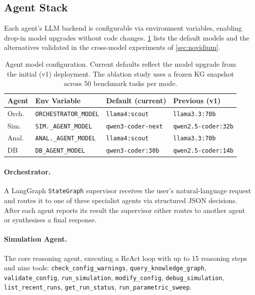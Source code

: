 \documentclass[twocolumn]{article}
\begin{document}
\subsection{Agent Stack}

Each agent's LLM backend is configurable via environment variables,
enabling drop-in model upgrades without code changes.
\cref{tab:agent-models} lists the default models and the alternatives
validated in the cross-model experiments of \cref{sec:novidium}.

\begin{table}[h]
\centering\scriptsize
\caption{Agent model configuration.  Current defaults reflect the
  model upgrade from the initial (v1) deployment.  The ablation study uses a frozen KG snapshot
  across 50 benchmark tasks per mode.}
\label{tab:agent-models}
\setlength{\tabcolsep}{2.5pt}
\begin{tabular}{@{}llll@{}}
\toprule
Agent & Env Variable & Default (current) & Previous (v1) \\
\midrule
Orch.  & \texttt{ORCHESTRATOR\_MODEL} & \texttt{llama4:scout} & \texttt{llama3.3:70b} \\
Sim.   & \texttt{SIM.\_AGENT\_MODEL} & \texttt{qwen3-coder-next} & \texttt{qwen2.5-coder:32b} \\
Anal.  & \texttt{ANAL.\_AGENT\_MODEL} & \texttt{llama4:scout} & \texttt{llama3.3:70b} \\
DB     & \texttt{DB\_AGENT\_MODEL} & \texttt{qwen3-coder:30b} & \texttt{qwen2.5-coder:14b} \\
\bottomrule
\end{tabular}
\end{table}

\paragraph{Orchestrator.}
A LangGraph \texttt{StateGraph} supervisor receives the user's
natural-language request and routes it to one of three specialist agents via
structured JSON decisions.  After each agent reports its result the
supervisor either routes to another agent or synthesises a final response.

\paragraph{Simulation Agent.}
The core reasoning agent, executing a ReAct loop \citep{yao2023react}
with up to 15 reasoning steps and nine tools:
\texttt{check\_config\_warnings},
\texttt{query\_knowledge\_graph},
\texttt{validate\_config},
\texttt{run\_simulation},
\texttt{modify\_config},
\texttt{debug\_simulation},
\texttt{list\_recent\_runs},
\texttt{get\_run\_status},
\texttt{run\_parametric\_sweep}.
\end{document}
